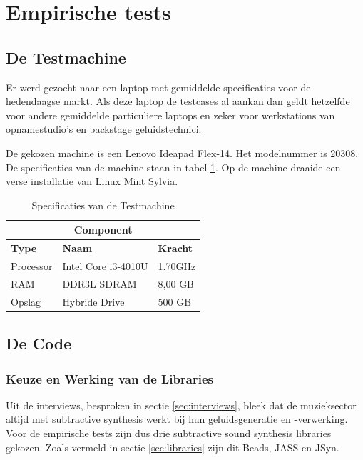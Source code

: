 \section{Empirische tests}
\label{sec:methodologie:empirischetests}

\subsection{De Testmachine}
\label{subsec:methodologie:testmachine}

Er werd gezocht naar een laptop met gemiddelde specificaties voor de hedendaagse markt. Als deze laptop de testcases al aankan dan geldt hetzelfde voor andere gemiddelde particuliere laptops en zeker voor werkstations van opnamestudio's en backstage geluidstechnici.

De gekozen machine is een Lenovo Ideapad Flex-14. Het modelnummer is 20308. De specificaties van de machine staan in tabel \ref{tab:specmachine}. Op de machine draaide een verse installatie van Linux Mint Sylvia.

\begin{table}[]
\centering
\begin{tabular}{lll}
\hline
\multicolumn{3}{c}{\textbf{Component}}                \\ \hline
\textbf{Type} & \textbf{Naam}       & \textbf{Kracht} \\ \hline
Processor     & Intel Core i3-4010U & 1.70GHz         \\ \hline
RAM           & DDR3L SDRAM         & 8,00 GB         \\ \hline
Opslag        & Hybride Drive       & 500 GB
\end{tabular}
\caption{Specificaties van de Testmachine}
\label{tab:specmachine}
\end{table}

\subsection{De Code}
\label{subsec:methodologie:code}

\subsubsection{Keuze en Werking van de Libraries}

Uit de interviews, besproken in sectie \ref{sec:interviews}, bleek dat de muzieksector altijd met subtractive synthesis werkt bij hun geluidsgeneratie en -verwerking. Voor de empirische tests zijn dus drie subtractive sound synthesis libraries gekozen. Zoals vermeld in sectie \ref{sec:libraries} zijn dit Beads, JASS en JSyn.

